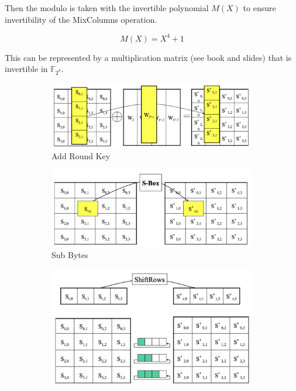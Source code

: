 Then the modulo is taken with the invertible polynomial $M(X)$ to ensure invertibility of the MixColumns operation.

\[ M(X) = X^4 + 1 \]

This can be represented by a multiplication matrix (see book and slides) that is invertible in $\mathbb{F}_{2^8}$.


\begin{figure}[h!]
    \centering
    \begin{subfigure}[t]{0.45\textwidth}
        \centering
        \includegraphics[width=\textwidth]{img/addroundkey.png}
        \caption{Add Round Key}
    \end{subfigure}
    \hfill
    \begin{subfigure}[t]{0.45\textwidth}
        \centering
        \includegraphics[width=\textwidth]{img/subbytes.png}
        \caption{Sub Bytes}
    \end{subfigure}
    \vfill
    \begin{subfigure}[t]{0.45\textwidth}
        \centering
        \includegraphics[width=\textwidth]{img/shiftrows.png}

\end{subfigure}
\end{figure}
